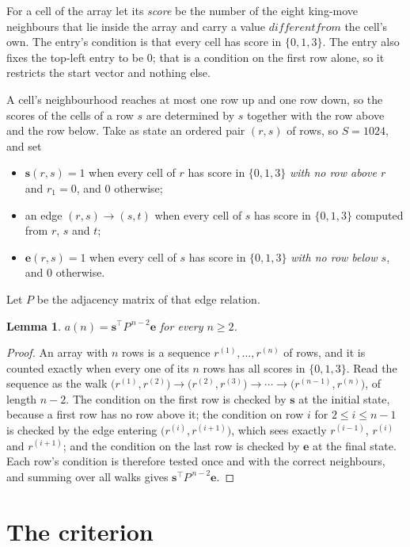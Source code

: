 \documentclass[11pt,a4paper]{article}
\theoremstyle{plain}
\newtheorem{lemma}[theorem]{Lemma}
\theoremstyle{definition}
\begin{document}
For a cell of the array let its \emph{score} be the number of the eight king-move neighbours that lie inside
the array and carry a value $different from$ the cell's own. The entry's condition is that every cell
has score in $\{0,1,3\}$. The entry also fixes the top-left entry to be $0$; that is a condition on the first row alone, so it restricts the start vector and nothing else.

A cell's neighbourhood reaches at most one row up and one row down, so the scores of the
cells of a row $s$ are determined by $s$ together with the row above and the row below.
Take as state an ordered pair $(r,s)$ of rows, so $S=1024$, and set
\begin{itemize}
\item $\mathbf{s}(r,s)=1$ when every cell of $r$ has score in $\{0,1,3\}$ \emph{with no row
above $r$} and $r_1=0$, and $0$ otherwise;
\item an edge $(r,s)\to(s,t)$ when every cell of $s$ has score in $\{0,1,3\}$ computed from
$r$, $s$ and $t$;
\item $\mathbf{e}(r,s)=1$ when every cell of $s$ has score in $\{0,1,3\}$ \emph{with no row
below $s$}, and $0$ otherwise.
\end{itemize}
Let $P$ be the adjacency matrix of that edge relation.

\begin{lemma}\label{lem:walk}
$a(n)=\mathbf{s}^{\!\top}P^{\,n-2}\mathbf{e}$ for every $n\ge2$.
\end{lemma}

\begin{proof}
An array with $n$ rows is a sequence $r^{(1)},\dots,r^{(n)}$ of rows, and it is counted
exactly when every one of its $n$ rows has all scores in $\{0,1,3\}$. Read the sequence as the
walk $\bigl(r^{(1)},r^{(2)}\bigr)\to\bigl(r^{(2)},r^{(3)}\bigr)\to\cdots\to
\bigl(r^{(n-1)},r^{(n)}\bigr)$, of length $n-2$. The condition on the first row is
checked by $\mathbf{s}$ at the initial state, because a first row has no row above it; the
condition on row $i$ for $2\le i\le n-1$ is checked by the edge entering
$\bigl(r^{(i)},r^{(i+1)}\bigr)$, which sees exactly $r^{(i-1)}$, $r^{(i)}$ and
$r^{(i+1)}$; and the condition on the last row is checked by $\mathbf{e}$ at the final
state. Each row's condition is therefore tested once and with the correct neighbours, and
summing over all walks gives $\mathbf{s}^{\!\top}P^{\,n-2}\mathbf{e}$.
\end{proof}

\section{The criterion}
\end{document}
